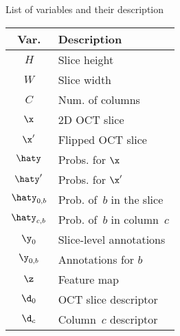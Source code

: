 \begin{margintable}[]\small
\caption{List of variables and their description}
\label{tab:var_list_loc}
\begin{tabular}{@{}cl@{}}
\toprule
\textbf{Var.}       & \textbf{Description}                                                                                         \\ \midrule
$H$            & Slice height                                                                              \\
$W$            & Slice width                                                                           \\
$C$            & Num. of columns                                              \\
$\x$           & 2D OCT slice                                                                                        \\
$\x'$          & Flipped OCT slice                                                                                \\
$\haty$        & Probs. for $\x$                                                \\
$\haty'$       & Probs. for $\x'$                                   \\
$\haty_{0,b}$  & Prob. of~$b$ in the slice                                              \\
$\haty_{c, b}$ & Prob. of~$b$ in column~$c$                                                        \\
$\y_0$         & Slice-level annotations                                                                             \\
$\y_{0,b}$     & Annotations for $b$                                                           \\
$\z$           & Feature map                                                                      \\
$\d_0$         & OCT slice descriptor               \\
$\d_c$         & Column~$c$ descriptor    \\ \bottomrule
\end{tabular}
\end{margintable}
